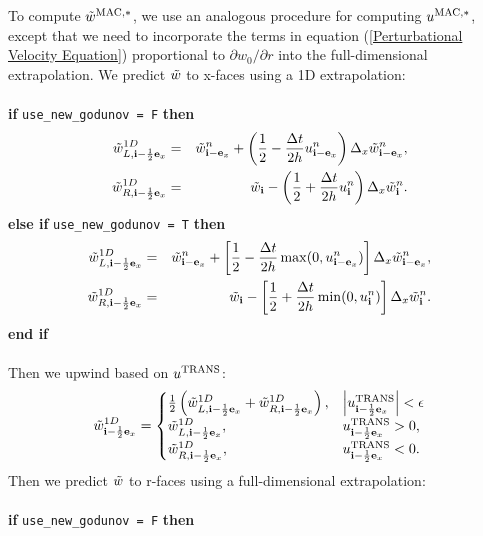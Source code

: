 To compute $\tilde{w}^{\rm MAC,*}$, we use an analogous procedure for computing
$u^{\rm MAC,*}$, except that we need to incorporate the terms in equation
(\ref{Perturbational Velocity Equation}) proportional to 
$\partial w_0/\partial r$ into the full-dimensional extrapolation.  We
predict $\tilde{w}$ to x-faces using a 1D extrapolation:\\ \\
{\bf if} {\tt use\_new\_godunov = F} {\bf then}
\begin{eqnarray}
\tilde{w}_{L,{\bf i}-\frac{1}{2}{\bf e}_x}^{1D} &=& \tilde{w}_{{\bf i}-{\bf e}_x}^n + \left(\frac{1}{2} - \frac{\Delta t}{2h}u_{{\bf i}-{\bf e}_x}^n\right)\Delta_x \tilde{w}_{{\bf i}-{\bf e}_x}^n, \\
\tilde{w}_{R,{\bf i}-\frac{1}{2}{\bf e}_x}^{1D} &=& \tilde{w}_{{\bf i}} - \left(\frac{1}{2} + \frac{\Delta t}{2h}u_{{\bf i}}^n\right)\Delta_x \tilde{w}_{{\bf i}}^n.
\end{eqnarray}
{\bf else if} {\tt use\_new\_godunov = T} {\bf then}
\begin{eqnarray}
\tilde{w}_{L,{\bf i}-\frac{1}{2}{\bf e}_x}^{1D} &=& \tilde{w}_{{\bf i}-{\bf e}_x}^n + \left[\frac{1}{2} - \frac{\Delta t}{2h}\max(0,u_{{\bf i}-{\bf e}_x}^n)\right]\Delta_x \tilde{w}_{{\bf i}-{\bf e}_x}^n, \\
\tilde{w}_{R,{\bf i}-\frac{1}{2}{\bf e}_x}^{1D} &=& \tilde{w}_{{\bf i}} - \left[\frac{1}{2} + \frac{\Delta t}{2h}\min(0,u_{{\bf i}}^n)\right]\Delta_x \tilde{w}_{{\bf i}}^n.
\end{eqnarray}
{\bf end if}\\ \\
Then we upwind based on $u^{\rm TRANS}$:
\begin{equation}
\tilde{w}_{{\bf i}-\frac{1}{2}{\bf e}_x}^{1D} =
\begin{cases}
\frac{1}{2}\left(\tilde{w}_{L,{\bf i}-\frac{1}{2}{\bf e}_x}^{1D} + \tilde{w}_{R,{\bf i}-\frac{1}{2}{\bf e}_x}^{1D}\right), & \left|u^{\rm TRANS}_{{\bf i}-\frac{1}{2}{\bf e}_x}\right| < \epsilon \\
\tilde{w}_{L,{\bf i}-\frac{1}{2}{\bf e}_x}^{1D}, & u^{\rm TRANS}_{{\bf i}-\frac{1}{2}{\bf e}_x} > 0, \\
\tilde{w}_{R,{\bf i}-\frac{1}{2}{\bf e}_x}^{1D}, & u^{\rm TRANS}_{{\bf i}-\frac{1}{2}{\bf e}_x} < 0. \\
\end{cases}
\end{equation}
Then we predict $\tilde{w}$ to r-faces using a full-dimensional extrapolation:\\ \\
{\bf if} {\tt use\_new\_godunov = F} {\bf then}
